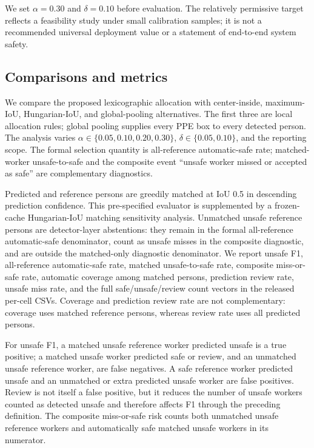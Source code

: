 \documentclass[iicol,pdflatex,sn-mathphys-num]{sn-jnl}
\begin{document}
We set $\alpha=0.30$ and $\delta=0.10$ before evaluation. The relatively permissive target reflects a feasibility study under small calibration samples; it is not a recommended universal deployment value or a statement of end-to-end system safety.

\subsection{Comparisons and metrics}

We compare the proposed lexicographic allocation with center-inside, maximum-IoU, Hungarian-IoU, and global-pooling alternatives. The first three are local allocation rules; global pooling supplies every PPE box to every detected person. The analysis varies $\alpha\in\{0.05,0.10,0.20,0.30\}$, $\delta\in\{0.05,0.10\}$, and the reporting scope. The formal selection quantity is all-reference automatic-safe rate; matched-worker unsafe-to-safe and the composite event ``unsafe worker missed or accepted as safe'' are complementary diagnostics.

Predicted and reference persons are greedily matched at IoU 0.5 in descending prediction confidence. This pre-specified evaluator is supplemented by a frozen-cache Hungarian-IoU matching sensitivity analysis. Unmatched unsafe reference persons are detector-layer abstentions: they remain in the formal all-reference automatic-safe denominator, count as unsafe misses in the composite diagnostic, and are outside the matched-only diagnostic denominator. We report unsafe F1, all-reference automatic-safe rate, matched unsafe-to-safe rate, composite miss-or-safe rate, automatic coverage among matched persons, prediction review rate, unsafe miss rate, and the full safe/unsafe/review count vectors in the released per-cell CSVs. Coverage and prediction review rate are not complementary: coverage uses matched reference persons, whereas review rate uses all predicted persons.

For unsafe F1, a matched unsafe reference worker predicted unsafe is a true positive; a matched unsafe worker predicted safe or review, and an unmatched unsafe reference worker, are false negatives. A safe reference worker predicted unsafe and an unmatched or extra predicted unsafe worker are false positives. Review is not itself a false positive, but it reduces the number of unsafe workers counted as detected unsafe and therefore affects F1 through the preceding definition. The composite miss-or-safe risk counts both unmatched unsafe reference workers and automatically safe matched unsafe workers in its numerator.
\end{document}
